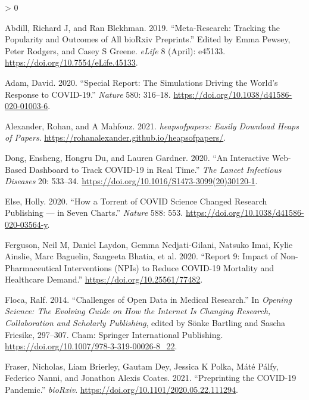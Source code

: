 \documentclass[
]{article}
\newlength{\cslhangindent}
\newenvironment{CSLReferences}[2] %
 {%
  \setlength{\parindent}{0pt}
  \ifodd #1 \everypar{\setlength{\hangindent}{\cslhangindent}}\ignorespaces\fi
  \ifnum #2 > 0
  \setlength{\parskip}{#2\baselineskip}
  \fi
 }%
 {}
\begin{document}
\hypertarget{refs}{}
\begin{CSLReferences}{1}{0}
\leavevmode\hypertarget{ref-abdill2019}{}%
Abdill, Richard J, and Ran Blekhman. 2019. {``Meta-Research: Tracking the Popularity and Outcomes of All bioRxiv Preprints.''} Edited by Emma Pewsey, Peter Rodgers, and Casey S Greene. \emph{eLife} 8 (April): e45133. \url{https://doi.org/10.7554/eLife.45133}.

\leavevmode\hypertarget{ref-adam2020}{}%
Adam, David. 2020. {``Special Report: The Simulations Driving the World's Response to COVID-19.''} \emph{Nature} 580: 316--18. \url{https://doi.org/10.1038/d41586-020-01003-6}.

\leavevmode\hypertarget{ref-citealexandermafouz}{}%
Alexander, Rohan, and A Mahfouz. 2021. \emph{{heapsofpapers: Easily Download Heaps of Papers}}. \url{https://rohanalexander.github.io/heapsofpapers/}.

\leavevmode\hypertarget{ref-citeCSSE}{}%
Dong, Ensheng, Hongru Du, and Lauren Gardner. 2020. {``An Interactive Web-Based Dashboard to Track COVID-19 in Real Time.''} \emph{The Lancet Infectious Diseases} 20: 533--34. \url{https://doi.org/10.1016/S1473-3099(20)30120-1}.

\leavevmode\hypertarget{ref-else2020}{}%
Else, Holly. 2020. {``How a Torrent of COVID Science Changed Research Publishing --- in Seven Charts.''} \emph{Nature} 588: 553. \url{https://doi.org/10.1038/d41586-020-03564-y}.

\leavevmode\hypertarget{ref-ferguson2020}{}%
Ferguson, Neil M, Daniel Laydon, Gemma Nedjati-Gilani, Natsuko Imai, Kylie Ainslie, Marc Baguelin, Sangeeta Bhatia, et al. 2020. {``Report 9: Impact of Non-Pharmaceutical Interventions (NPIs) to Reduce COVID-19 Mortality and Healthcare Demand.''} \url{https://doi.org/10.25561/77482}.

\leavevmode\hypertarget{ref-Floca2014}{}%
Floca, Ralf. 2014. {``Challenges of Open Data in Medical Research.''} In \emph{Opening Science: The Evolving Guide on How the Internet Is Changing Research, Collaboration and Scholarly Publishing}, edited by Sönke Bartling and Sascha Friesike, 297--307. Cham: Springer International Publishing. \url{https://doi.org/10.1007/978-3-319-00026-8_22}.

\leavevmode\hypertarget{ref-citeFraser}{}%
Fraser, Nicholas, Liam Brierley, Gautam Dey, Jessica K Polka, Máté Pálfy, Federico Nanni, and Jonathon Alexis Coates. 2021. {``Preprinting the COVID-19 Pandemic.''} \emph{bioRxiv}. \url{https://doi.org/10.1101/2020.05.22.111294}.


\end{CSLReferences}
\end{document}
